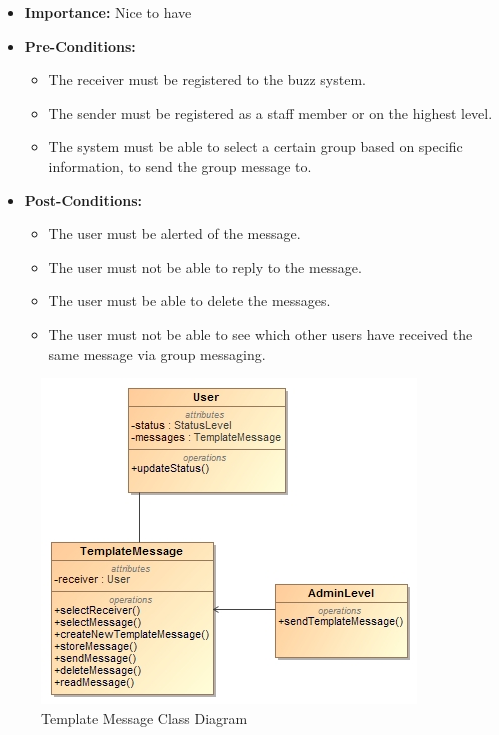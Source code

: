 \documentclass[11pt]{article}
\begin{document}
\begin{enumerate}
\begin{itemize}
\item \textbf{Importance:} Nice to have
\item\textbf{Pre-Conditions: }
	\begin{itemize}
		\item The receiver must be registered to the buzz system.
		\item The sender must be registered as a staff member or on the highest level.
		\item The system must be able to select a certain group based on specific information, to send the group message to.

	\end{itemize}

\item\textbf{Post-Conditions: }
	\begin{itemize}
		\item The user must be alerted of the message.
		\item The user must not be able to reply to the message.
		\item The user must be able to delete the messages.
		\item The user must not be able to see which other users have received the same message via group messaging.
	\end{itemize}
\end{itemize}
\graphicspath{ {../Diagrams/Maret/class/} }
	\begin{figure}[H]	
    	\includegraphics[scale=0.5,center]{TemplateMessages.jpg}
    	\caption{Template Message Class Diagram}
	\end{figure}
\graphicspath{ {../Diagrams/Maret/usecase/} }	
	\begin{figure}[H]	

\end{figure}
\end{enumerate}
\end{document}
